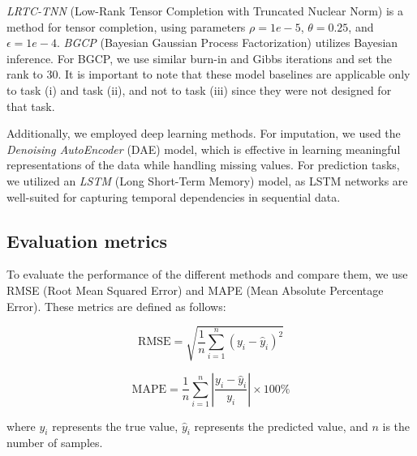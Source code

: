 \textit{LRTC-TNN} (Low-Rank Tensor Completion with Truncated Nuclear Norm) \cite{lrtc} is a method for tensor completion, using parameters $\rho = 1e-5$, $\theta = 0.25$, and $\epsilon = 1e-4$. \textit{BGCP} (Bayesian Gaussian Process Factorization) utilizes Bayesian inference. For BGCP, we use similar burn-in and Gibbs iterations and set the rank to 30. It is important to note that these model baselines are applicable only to task (i) and task (ii), and not to task (iii) since they were not designed for that task.

Additionally, we employed deep learning methods. For imputation, we used the \textit{Denoising AutoEncoder} (DAE) \cite{dae} model, which is effective in learning meaningful representations of the data while handling missing values. For prediction tasks, we utilized an \textit{LSTM} (Long Short-Term Memory) \cite{lstm} model, as LSTM networks are well-suited for capturing temporal dependencies in sequential data.


\subsection{Evaluation metrics}

To evaluate the performance of the different methods and compare them, we use RMSE (Root Mean Squared Error) and MAPE (Mean Absolute Percentage Error). These metrics are defined as follows:

\[
\text{RMSE} = \sqrt{\frac{1}{n} \sum_{i=1}^{n} (y_i - \hat{y}_i)^2}
\]

\[
\text{MAPE} = \frac{1}{n} \sum_{i=1}^{n} \left| \frac{y_i - \hat{y}_i}{y_i} \right| \times 100\%
\]

where \( y_i \) represents the true value, \( \hat{y}_i \) represents the predicted value, and \( n \) is the number of samples.